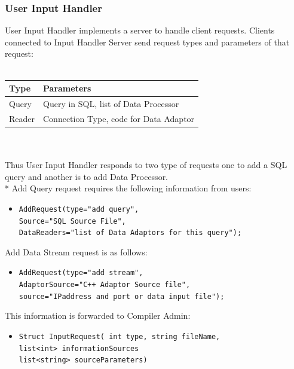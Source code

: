 \documentclass[14pt]{article}
\begin{document}
\subsubsection{User Input Handler}
User Input Handler implements a server to handle client requests. Clients connected to Input Handler Server send request types and parameters of that request:
\\
\\
\begin{tabular}{|l|l|}
  \hline
  Type & Parameters \\ \hline
  Query & Query in SQL, list of Data Processor \\ \hline
  Reader & Connection Type, code for Data Adaptor \\ \hline
\end{tabular}
\\
\\
Thus User Input Handler responds to two type of requests one to add a SQL query and another is to add Data Processor.
\\*
Add Query request requires the following information from users:

\begin{itemize}
	\item {\tt AddRequest(type="add query",\\
		 Source="SQL Source File",\\
	     DataReaders="list of Data Adaptors for this query");}
\end{itemize}

\noindent Add Data Stream request is as follows:

\begin{itemize}
	\item {\tt AddRequest(type="add stream", \\
	     AdaptorSource="C++ Adaptor Source file",\\
	     source="IPaddress and port or data input file");}
\end{itemize}

This information is forwarded to Compiler Admin:

\begin{itemize}
	\item {\tt Struct InputRequest( int type, string fileName,\\
	       list<int> informationSources \\
		   list<string> sourceParameters)}
\end{itemize}
\end{document}
